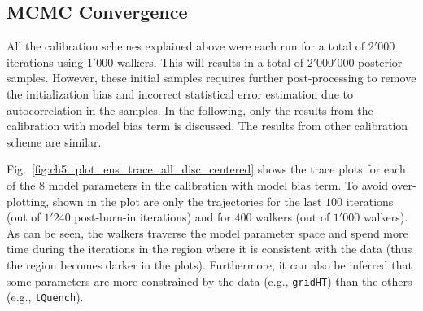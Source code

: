 \subsection{MCMC Convergence}\label{sub:bc_mcmc_convergence}

All the calibration schemes explained above were each run for a total of $2'000$ iterations using $1'000$ walkers. 
This will results in a total of $2'000'000$ posterior samples.
However, these initial samples requires further post-processing to remove the initialization bias and incorrect statistical error estimation due to autocorrelation in the samples.
In the following, only the results from the calibration with model bias term is discussed.
The results from other calibration scheme are similar.

Fig.~\ref{fig:ch5_plot_ens_trace_all_disc_centered} shows the trace plots for each of the $8$ model parameters in the calibration with model bias term.
To avoid over-plotting, shown in the plot are only the trajectories for the last $100$ iterations (out of $1'240$ post-burn-in iterations) and for $400$ walkers (out of $1'000$ walkers). 
As can be seen, the walkers traverse the model parameter space and spend more time during the iterations in the region where it is consistent with the data (thus the region becomes darker in the plots).
Furthermore, it can also be inferred that some parameters are more constrained by the data (e.g., \texttt{gridHT}) than the others (e.g., \texttt{tQuench}).

